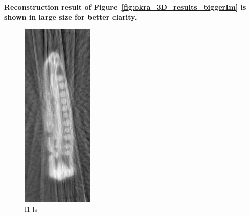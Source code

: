 \documentclass{article}
\begin{document}
\textbf{Reconstruction result of Figure~\ref{fig:okra_3D_results_biggerIm}   is shown in large size for better clarity.}
\begin{figure}[!h]
\centering
       \includegraphics[width=0.5\columnwidth]{../images/okra/cs_cropped.png}
\captionsetup{labelformat=empty}
        \caption{\large{l1-ls}}
\end{figure}
\newpage
\end{document}
